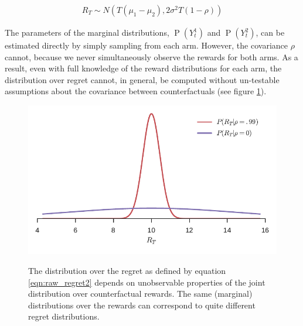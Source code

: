 \documentclass[11pt,a4paper,twoside]{report}
\newcommand{\eqn}[1]{\begin{align}#1\end{align}}
\renewcommand{\P}[1]{\operatorname{P}\left(#1\right)}
\newcommand{\cfb}[2]{{#1}_t^{#2}} %
\newcommand{\rawregret}{R_{T}} %
\theoremstyle{plain}
\theoremstyle{definition}
\begin{document}
\eqn{
\rawregret \sim N\left(T(\mu_1 - \mu_2), 2\sigma^2 T(1-\rho)\right)
}

The parameters of the marginal distributions, $\P{\cfb{Y}{1}}$ and $\P{\cfb{Y}{2}}$, can be estimated directly by simply sampling from each arm. However, the covariance $\rho$ cannot, because we never simultaneously observe the rewards for both arms. As a result, even with full knowledge of the reward distributions for each arm, the distribution over regret cannot, in general, be computed without un-testable assumptions about the covariance between counterfactuals (see figure \ref{fig:metaphysical_distribution_difference}). 

\begin{figure}[ht]
\captionsetup[subfigure]{position=b}
\centering
{}
\hspace{0.02\textwidth}
{\includegraphics[width=.45\linewidth]{figures/counterfactual_nonidentify_b.pdf}}
\caption{The distribution over the regret as defined by equation \ref{eqn:raw_regret2} depends on unobservable properties of the joint distribution over counterfactual rewards. The same (marginal) distributions over the rewards can correspond to quite different regret distributions.}
\label{fig:metaphysical_distribution_difference}
\end{figure}
\end{document}
